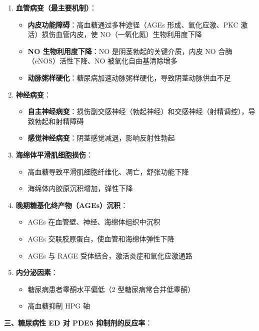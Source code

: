 \begin{enumerate}
	\item \textbf{血管病变（最主要机制）}：
	\begin{itemize}
		\item \textbf{内皮功能障碍}：高血糖通过多种途径（AGEs 形成、氧化应激、PKC 激活）损伤血管内皮，使 NO（一氧化氮）生物利用度下降
		\item \textbf{NO 生物利用度下降}：NO 是阴茎勃起的关键介质，内皮 NO 合酶（eNOS）活性下降、NO 被氧化自由基清除增多
		\item \textbf{动脉粥样硬化}：糖尿病加速动脉粥样硬化，导致阴茎动脉供血不足
	\end{itemize}

	\item \textbf{神经病变}：
	\begin{itemize}
		\item \textbf{自主神经病变}：损伤副交感神经（勃起神经）和交感神经（射精调控），导致勃起和射精障碍
		\item \textbf{感觉神经病变}：阴茎感觉减退，影响反射性勃起
	\end{itemize}

	\item \textbf{海绵体平滑肌细胞损伤}：
	\begin{itemize}
		\item 高血糖导致平滑肌细胞纤维化、凋亡，舒张功能下降
		\item 海绵体内胶原沉积增加，弹性下降
	\end{itemize}

	\item \textbf{晚期糖基化终产物（AGEs）沉积}：
	\begin{itemize}
		\item AGEs 在血管壁、神经、海绵体组织中沉积
		\item AGEs 交联胶原蛋白，使血管和海绵体弹性下降
		\item AGEs 与 RAGE 受体结合，激活炎症和氧化应激通路
	\end{itemize}

	\item \textbf{内分泌因素}：
	\begin{itemize}
		\item 糖尿病患者睾酮水平偏低（2 型糖尿病常合并低睾酮）
		\item 高血糖抑制 HPG 轴
	\end{itemize}
\end{enumerate}

\vspace{0.5em}
\noindent\textbf{三、糖尿病性 ED 对 PDE5 抑制剂的反应率}：

